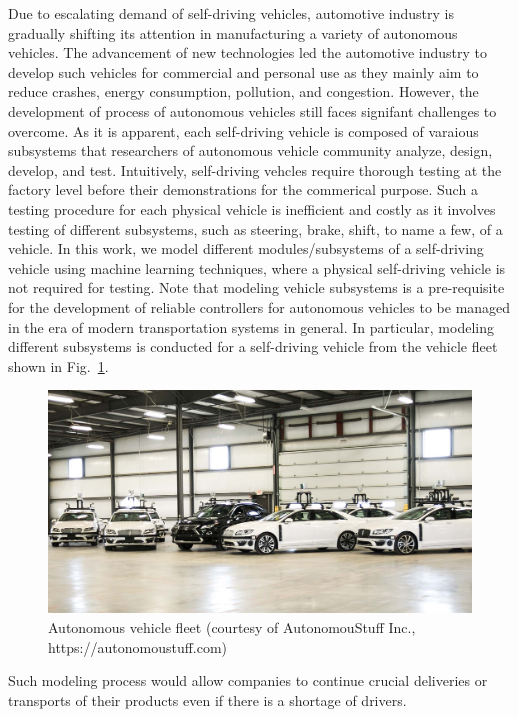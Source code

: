 \documentclass[conference]{IEEEtran}
\begin{document}
Due to escalating demand of self-driving vehicles, automotive industry is gradually shifting its attention in  manufacturing a variety of autonomous vehicles. The advancement of new technologies led the automotive industry to develop such vehicles for commercial and personal use as they mainly aim to reduce crashes, energy consumption, pollution, and congestion. However, the development of process of autonomous vehicles still faces signifant challenges to overcome. As it is apparent, each self-driving vehicle is composed of varaious subsystems that researchers of autonomous vehicle community analyze, design, develop, and test.  Intuitively, self-driving vehcles require thorough testing at the factory level before their demonstrations for  the commerical purpose. Such a testing procedure for each physical vehicle is inefficient and costly as it involves testing of different subsystems, such as steering, brake, shift, to name a few, of a vehicle. In this work, we model different modules/subsystems of a self-driving vehicle using machine learning techniques, where a physical self-driving vehicle is not required for testing. Note that modeling vehicle subsystems is a pre-requisite for the development of reliable controllers for autonomous vehicles to be managed in the era of modern transportation systems in general. In particular, modeling different subsystems is conducted for a self-driving vehicle from the vehicle fleet shown in Fig.~\ref{fig:fleet}. %
%
\begin{figure}[htbp]
  \centering
  \includegraphics[scale=0.15]{figs/img/autonomousVehiclesAStuff}
  \caption{Autonomous vehicle fleet (courtesy of AutonomouStuff Inc., https://autonomoustuff.com)}
  \label{fig:fleet}
\end{figure}
%
Such modeling process would allow companies to continue crucial deliveries or transports of their products even if there is a shortage of drivers. %
\end{document}
